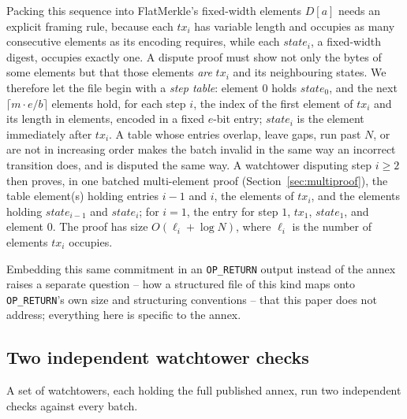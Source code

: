 Packing this sequence into FlatMerkle's fixed-width elements $D[a]$ needs
an explicit framing rule, because each $\mathit{tx}_i$ has variable length
and occupies as many consecutive elements as its encoding requires, while
each $\mathit{state}_i$, a fixed-width digest, occupies exactly one. A
dispute proof must show not only the bytes of some elements but that those
elements \emph{are} $\mathit{tx}_i$ and its neighbouring states. We
therefore let the file begin with a \emph{step table}: element $0$ holds
$\mathit{state}_0$, and the next $\lceil m \cdot e / b \rceil$ elements
hold, for each step $i$, the index of the first element of
$\mathit{tx}_i$ and its length in elements, encoded in a fixed $e$-bit
entry; $\mathit{state}_i$ is the element immediately after
$\mathit{tx}_i$. A table whose entries overlap, leave gaps, run past $N$,
or are not in increasing order makes the batch invalid in the same way an
incorrect transition does, and is disputed the same way. A watchtower
disputing step $i \ge 2$ then proves, in one batched multi-element proof
(Section~\ref{sec:multiproof}), the table element(s) holding entries
$i-1$ and $i$, the elements of $\mathit{tx}_i$, and the elements holding
$\mathit{state}_{i-1}$ and $\mathit{state}_i$; for $i = 1$, the entry for
step $1$, $\mathit{tx}_1$, $\mathit{state}_1$, and element $0$. The proof
has size $O(\ell_i + \log N)$, where $\ell_i$ is the number of elements
$\mathit{tx}_i$ occupies.

Embedding this same commitment in an \texttt{OP\_RETURN} output instead of
the annex raises a separate question -- how a structured file of this kind
maps onto \texttt{OP\_RETURN}'s own size and structuring conventions --
that this paper does not address; everything here is specific to the
annex.

\subsection{Two independent watchtower checks}
\label{sec:rollup-checks}

A set of watchtowers, each holding the full published annex, run two
independent checks against every batch.

